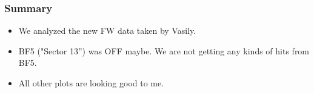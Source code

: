 \documentclass{beamer}
\begin{document}
\begin{frame}
\frametitle{Summary}
\vspace*{0.2cm}
\begin{center}
  
\begin{itemize} 
\item {\small We analyzed the new FW data taken by Vasily.}
\item {\small  BF5 ("Sector 13'') was OFF maybe. We are not getting any kinds of hits from BF5.}
\item {\small All other plots are looking good to me.}
\end{itemize}

\end{center}
\end{frame}
\end{document}
